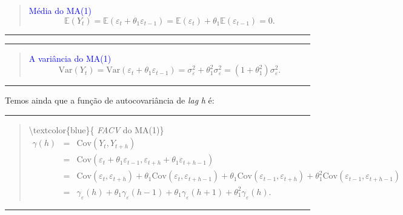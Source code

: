 \documentclass[
]{book}
\theoremstyle{definition}
\theoremstyle{definition}
\theoremstyle{definition}
\theoremstyle{remark}
\begin{document}
\begin{quote}
\textcolor{blue}{ Média do MA(1)}\\
\[\mathbb{E} (Y_t ) = \mathbb{E}(\varepsilon_t + \theta_1 \varepsilon_{t-1})=\mathbb{E}(\varepsilon_t) + \theta_1 \mathbb{E}(\varepsilon_{t-1})=0.\]
\end{quote}

\begin{center}\rule{0.5\linewidth}{0.5pt}\end{center}

\begin{center}\rule{0.5\linewidth}{0.5pt}\end{center}

\begin{quote}
\textcolor{blue}{A variância do MA(1)}\\
\[\mbox{Var}(Y_t )=\mbox{Var}(\varepsilon_t + \theta_1 \varepsilon_{t-1} )= \sigma_\varepsilon^2+\theta_1^2\sigma_\varepsilon^2=(1+\theta_1^2)\sigma_\varepsilon^2.\]
\end{quote}

\begin{center}\rule{0.5\linewidth}{0.5pt}\end{center}

Temos ainda que a função de autocovariância de \emph{lag} \emph{h} é:

\begin{center}\rule{0.5\linewidth}{0.5pt}\end{center}

\begin{quote}
\textbackslash textcolor\{blue\}\{ \emph{FACV} do MA(1)\}
\begin{eqnarray*}
\gamma(h) &=& \mbox{Cov}(Y_t , Y_{t+h} )\\
&=& \mbox{Cov}(\varepsilon_t + \theta_1 \varepsilon_{t-1}, \varepsilon_{t+h} + \theta_1 \varepsilon_{t+h-1} )\\
&=& \mbox{Cov}(\varepsilon_t,\varepsilon_{t+h})+\theta_1\mbox{Cov}(\varepsilon_{t}, \varepsilon_{t+h-1})+\theta_1\mbox{Cov}(\varepsilon_{t-1}, \varepsilon_{t+h})+\theta_1^2\mbox{Cov}(\varepsilon_{t-1}, \varepsilon_{t+h-1})\\
&=&\gamma_\varepsilon(h)+\theta_1\gamma_\varepsilon(h-1)+\theta_1\gamma_\varepsilon(h+1)+\theta_1^2\gamma_\varepsilon(h).
\end{eqnarray*}
\end{quote}

\begin{center}\rule{0.5\linewidth}{0.5pt}\end{center}
\end{document}

